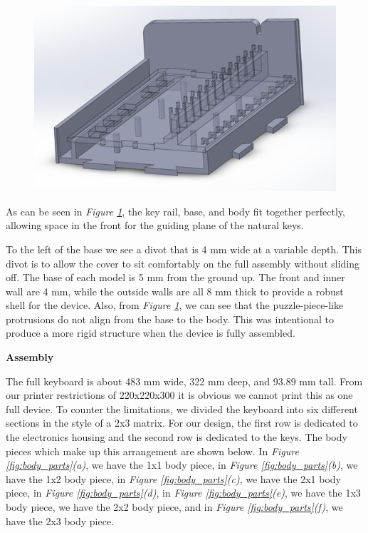 \begin{figure}[h!]
  \centering
  \includegraphics[width=0.8\linewidth]{image/BodyModel2.png}
  \caption{}
  \label{fig:body_model2}
\end{figure}

As can be seen in \textit{Figure \ref{fig:body_model2}}, the key rail, base, and body fit together perfectly, allowing space in the front for the guiding plane of the natural keys.

To the left of the base we see a divot that is 4 mm wide at a variable depth. This divot is to allow the cover to sit comfortably on the full assembly without sliding off. The base of each model is 5 mm from the ground up. The front and inner wall are 4 mm, while the outside walls are all 8 mm thick to provide a robust shell for the device. Also, from \textit{Figure \ref{fig:body_model2}}, we can see that the puzzle-piece-like protrusions do not align from the base to the body. This was intentional to produce a more rigid structure when the device is fully assembled.

\textbf{Assembly}

The full keyboard is about 483 mm wide, 322 mm deep, and 93.89 mm tall. From our printer restrictions of 220x220x300 it is obvious we cannot print this as one full device. To counter the limitations, we divided the keyboard into six different sections in the style of a 2x3 matrix. For our design, the first row is dedicated to the electronics housing and the second row is dedicated to the keys. The body pieces which make up this arrangement are shown below. In \textit{Figure \ref{fig:body_parts}(a)}, we have the 1x1 body piece, in \textit{Figure \ref{fig:body_parts}(b)}, we have the 1x2 body piece, in \textit{Figure \ref{fig:body_parts}(c)}, we have the 2x1 body piece, in \textit{Figure \ref{fig:body_parts}(d)}, in \textit{Figure \ref{fig:body_parts}(e)}, we have the 1x3 body piece, we have the 2x2 body piece, and in \textit{Figure \ref{fig:body_parts}(f)}, we have the 2x3 body piece.

